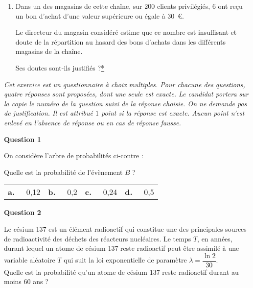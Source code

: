 \documentclass[12pt,french]{article}
\begin{document}
\begin{question}[subtitle={Métropole 2015}]
\begin{enumerate}
\item Dans un des magasins de cette chaîne, sur $200$ clients privilégiés, $6$ ont reçu un bon d'achat d'une valeur supérieure ou égale à $30$~\euro.

\smallskip

Le directeur du magasin considéré estime que ce nombre est insuffisant et doute de la répartition
au hasard des bons d'achats dans les différents magasins de la chaîne.

Ses doutes sont-ils justifiés ?\hyperlink{Index}{*}
\end{enumerate}

\end{question}

\begin{question}[subtitle={Métropole septembre 2015}]
\emph{Cet exercice est un questionnaire à choix multiples. Pour chacune des questions, quatre réponses sont proposées, dont une seule est exacte. Le candidat portera sur la copie le numéro de la question suivi de la réponse choisie. On ne demande pas de justification. Il est attribué $1$ point si la réponse est exacte. Aucun point n'est enlevé en l'absence de réponse ou en cas de réponse fausse.}

\medskip

\textbf{Question 1}

\parbox{0.6\linewidth}{On considère l'arbre de probabilités ci-contre :}\hfill
\medskip

Quelle est la probabilité de l'évènement $B$ ?

\medskip
\begin{tabularx}{\linewidth}{*{4}{X}}
\textbf{a.~~} 0,12&\textbf{b.~~} 0,2&\textbf{c.~~} 0,24 &\textbf{d.~~} 0,5
\end{tabularx}
\medskip

\textbf{Question 2}

Le césium 137 est un élément radioactif qui constitue une des principales sources de radioactivité des déchets des réacteurs nucléaires. Le temps $T$, en années, durant lequel un atome de césium 137 reste radioactif peut être assimilé à une variable aléatoire $T$ qui suit la loi exponentielle de paramètre $\lambda = \dfrac{\ln 2}{30}$.\\[5pt]
Quelle est la probabilité qu'un atome de césium 137 reste radioactif durant au moins 60 ans ?


\end{question}
\end{document}
